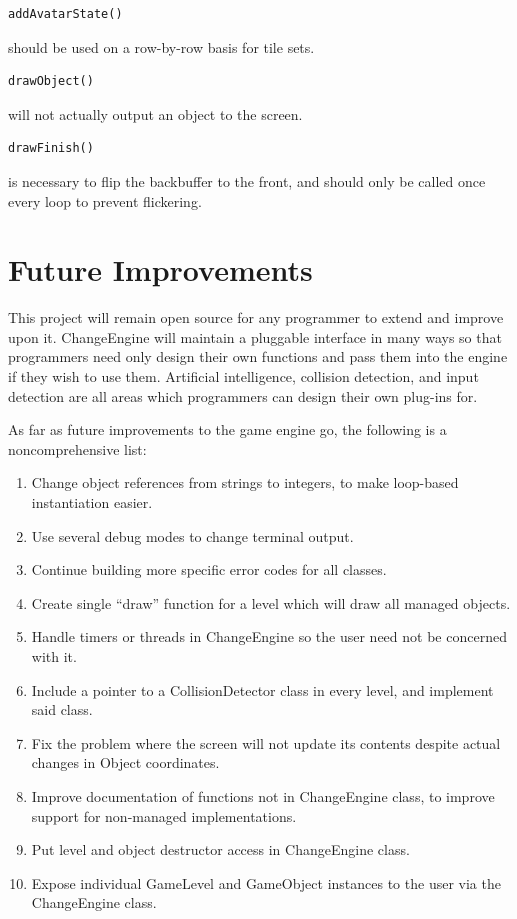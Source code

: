 \documentclass[12pt]{article}
\begin{document}
\begin{verbatim}addAvatarState()\end{verbatim} should be used on a row-by-row basis for tile sets.
\\

\begin{verbatim}drawObject()\end{verbatim} will not actually output an object to the screen.
\\

\begin{verbatim}drawFinish()\end{verbatim} is necessary to flip the backbuffer to the front, and should only be called once every loop to prevent flickering.

  \section{Future Improvements}
    This project will remain open source for any programmer to extend and improve upon it. ChangeEngine will maintain a pluggable interface in many ways so that programmers need only design their own functions and pass them into the engine if they wish to use them. Artificial intelligence, collision detection, and input detection are all areas which programmers can design their own plug-ins for.

As far as future improvements to the game engine go, the following is a noncomprehensive list:

\begin{enumerate}
 \item Change object references from strings to integers, to make loop-based instantiation easier.
 \item Use several debug modes to change terminal output.
 \item Continue building more specific error codes for all classes.
 \item Create single ``draw'' function for a level which will draw all managed objects.
 \item Handle timers or threads in ChangeEngine so the user need not be concerned with it.
 \item Include a pointer to a CollisionDetector class in every level, and implement said class.
 \item Fix the problem where the screen will not update its contents despite actual changes in Object coordinates.
 \item Improve documentation of functions not in ChangeEngine class, to improve support for non-managed implementations.
 \item Put level and object destructor access in ChangeEngine class.
 \item Expose individual GameLevel and GameObject instances to the user via the ChangeEngine class.
\end{enumerate}
\end{document}
